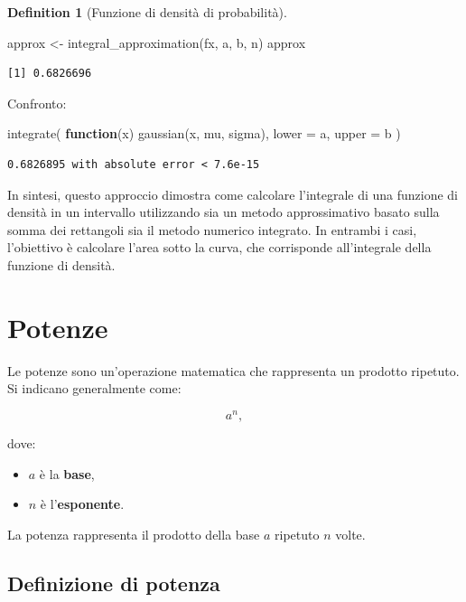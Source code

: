 \documentclass[
  letterpaper,
  DIV=11,
  numbers=noendperiod,
  oneside]{scrreprt}
\newenvironment{Shaded}{\begin{snugshade}}{\end{snugshade}}
\newcommand{\AttributeTok}[1]{\textcolor[rgb]{0.40,0.45,0.13}{#1}}
\newcommand{\ControlFlowTok}[1]{\textcolor[rgb]{0.00,0.23,0.31}{\textbf{#1}}}
\newcommand{\FunctionTok}[1]{\textcolor[rgb]{0.28,0.35,0.67}{#1}}
\newcommand{\NormalTok}[1]{\textcolor[rgb]{0.00,0.23,0.31}{#1}}
\newcommand{\OtherTok}[1]{\textcolor[rgb]{0.00,0.23,0.31}{#1}}
\providecommand{\tightlist}{%
  \setlength{\itemsep}{0pt}\setlength{\parskip}{0pt}}
\theoremstyle{definition}
\theoremstyle{plain}
\theoremstyle{definition}
\newtheorem{definition}{Definition}[chapter]
\theoremstyle{remark}
\begin{document}
\begin{definition}[Funzione di densità di
probabilità]
\begin{Shaded}
\begin{Highlighting}[]
\NormalTok{approx }\OtherTok{\textless{}{-}} \FunctionTok{integral\_approximation}\NormalTok{(fx, a, b, n)}
\NormalTok{approx}
\end{Highlighting}
\end{Shaded}

\begin{verbatim}
[1] 0.6826696
\end{verbatim}

Confronto:

\begin{Shaded}
\begin{Highlighting}[]
\FunctionTok{integrate}\NormalTok{(}
  \ControlFlowTok{function}\NormalTok{(x) }\FunctionTok{gaussian}\NormalTok{(x, mu, sigma),}
  \AttributeTok{lower =}\NormalTok{ a,}
  \AttributeTok{upper =}\NormalTok{ b}
\NormalTok{)}
\end{Highlighting}
\end{Shaded}

\begin{verbatim}
0.6826895 with absolute error < 7.6e-15
\end{verbatim}

In sintesi, questo approccio dimostra come calcolare l'integrale di una
funzione di densità in un intervallo utilizzando sia un metodo
approssimativo basato sulla somma dei rettangoli sia il metodo numerico
integrato. In entrambi i casi, l'obiettivo è calcolare l'area sotto la
curva, che corrisponde all'integrale della funzione di densità.

\section{Potenze}\label{potenze}

Le potenze sono un'operazione matematica che rappresenta un prodotto
ripetuto. Si indicano generalmente come:

\[
a^n,
\]

dove:

\begin{itemize}
\tightlist
\item
  \(a\) è la \textbf{base},
\item
  \(n\) è l'\textbf{esponente}.
\end{itemize}

La potenza rappresenta il prodotto della base \(a\) ripetuto \(n\)
volte.

\subsection{Definizione di potenza}\label{definizione-di-potenza}


\end{definition}
\end{document}
